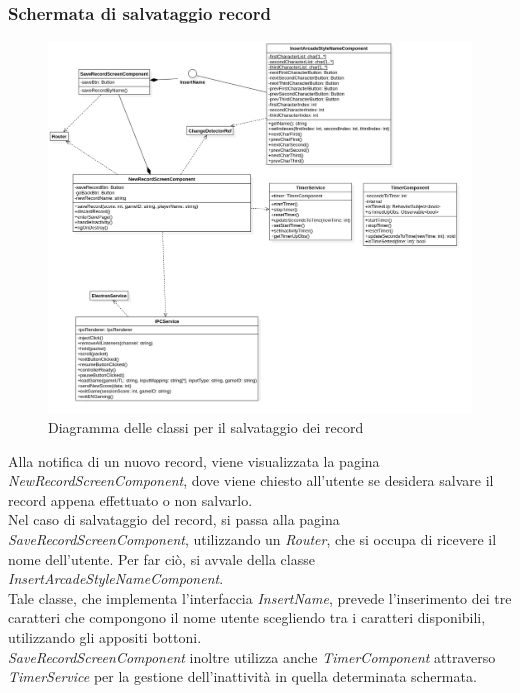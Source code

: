 \subsubsection{Schermata di salvataggio record}
\begin{figure}[h]
    \centering
    \includegraphics[width=340pt]{images/prog/NewRecord.png}
    \caption{Diagramma delle classi per il salvataggio dei record}
    \label{fig:newRecord}
\end{figure}
Alla notifica di un nuovo record, viene visualizzata la pagina \emph{NewRecordScreenComponent}, dove viene chiesto all'utente se desidera salvare il record appena effettuato o non salvarlo.\\
Nel caso di salvataggio del record, si passa alla pagina \emph{SaveRecordScreenComponent}, utilizzando un \emph{Router}, che si occupa di ricevere il nome dell'utente. Per far ciò, si avvale della classe \emph{InsertArcadeStyleNameComponent}.\\
Tale classe, che implementa l'interfaccia \emph{InsertName}, prevede l'inserimento dei tre caratteri che compongono il nome utente scegliendo tra i caratteri disponibili, utilizzando gli appositi bottoni.\\
\emph{SaveRecordScreenComponent} inoltre utilizza anche \emph{TimerComponent} attraverso \emph{TimerService} per la gestione dell'inattività in quella determinata schermata.
